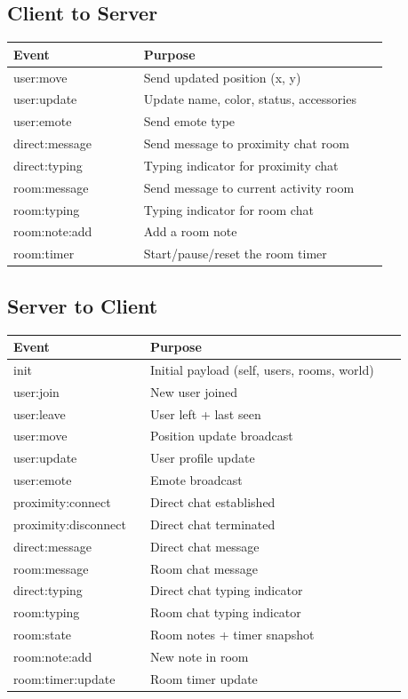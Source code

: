 \documentclass[11pt]{article}
\begin{document}
\subsection{Client to Server}
\begin{longtable}{p{0.32\linewidth}p{0.6\linewidth}}
\toprule
\textbf{Event} & \textbf{Purpose} \\
\midrule
user:move & Send updated position (x, y) \\
user:update & Update name, color, status, accessories \\
user:emote & Send emote type \\
direct:message & Send message to proximity chat room \\
direct:typing & Typing indicator for proximity chat \\
room:message & Send message to current activity room \\
room:typing & Typing indicator for room chat \\
room:note:add & Add a room note \\
room:timer & Start/pause/reset the room timer \\
\bottomrule
\end{longtable}

\subsection{Server to Client}
\begin{longtable}{p{0.32\linewidth}p{0.6\linewidth}}
\toprule
\textbf{Event} & \textbf{Purpose} \\
\midrule
init & Initial payload (self, users, rooms, world) \\
user:join & New user joined \\
user:leave & User left + last seen \\
user:move & Position update broadcast \\
user:update & User profile update \\
user:emote & Emote broadcast \\
proximity:connect & Direct chat established \\
proximity:disconnect & Direct chat terminated \\
direct:message & Direct chat message \\
room:message & Room chat message \\
direct:typing & Direct chat typing indicator \\
room:typing & Room chat typing indicator \\
room:state & Room notes + timer snapshot \\
room:note:add & New note in room \\
room:timer:update & Room timer update \\
\bottomrule
\end{longtable}
\end{document}
